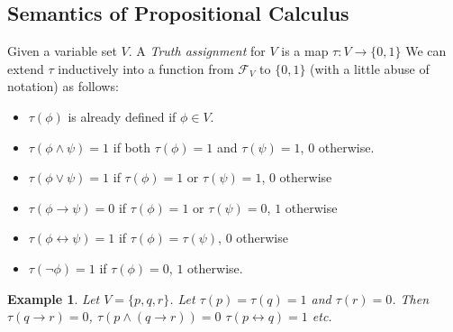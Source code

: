 \documentclass[a4paper,11pt]{article}
\newtheorem{example}{Example}
\begin{document}
\subsection*{Semantics of Propositional Calculus}

Given a variable set $V$.  A {\em Truth assignment} for $V$ is a map $\tau :V\longrightarrow \{0,1\}$
We can extend $\tau$ inductively into a function from $\mathcal{F}_V$ to $\{0,1\}$ (with a 
little abuse of notation) as follows:
\begin{itemize}
 \item $\tau(\phi)$ is already defined if $\phi \in V$.
 \item $\tau(\phi\wedge \psi)=1$ if both $\tau(\phi)=1$ and $\tau(\psi)=1$, $0$ otherwise.  
 \item $\tau(\phi\vee \psi)=1$ if $\tau(\phi)=1$ or $\tau(\psi)=1$, $0$ otherwise
 \item $\tau(\phi\rightarrow \psi)=0$ if $\tau(\phi)=1$ or $\tau(\psi)=0$, $1$ otherwise
 \item $\tau(\phi\leftrightarrow \psi)=1$ if $\tau(\phi)=\tau(\psi)$, $0$ otherwise
 \item $\tau(\neg \phi)=1$ if $\tau(\phi)=0$, $1$ otherwise.
\end{itemize}

\begin{example}
Let $V=\{p,q,r\}$.  Let $\tau(p)=\tau(q)=1$ and $\tau(r)=0$. Then $\tau(q\rightarrow r)=0$,
$\tau(p\wedge (q\rightarrow r))=0$ $\tau(p\leftrightarrow q)=1$ etc.
\end{example}
\end{document}
